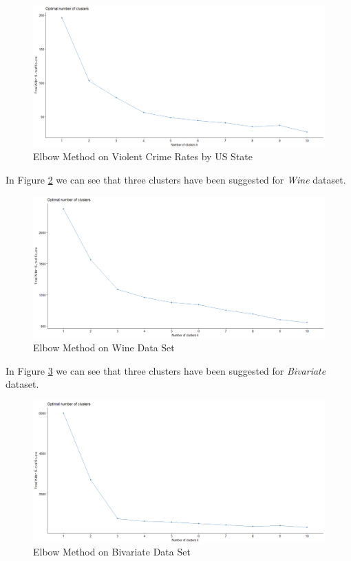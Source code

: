\begin{itemize}
\begin{figure}[h!]
  \centering
  \includegraphics[scale=1.3]{figures/results/USArrests/elbow.png}
  \caption{Elbow Method on Violent Crime Rates by US State}
  \label{fig:elbow5}
\end{figure}

\vspace{15mm}

In Figure \ref{fig:elbow6} we can see that three clusters have been suggested for \textit{Wine} dataset.

\begin{figure}[h!]
  \centering
  \includegraphics[scale=1.3]{figures/results/wine/elbow.png}
  \caption{Elbow Method on Wine Data Set}
  \label{fig:elbow6}
\end{figure}

\newpage

In Figure \ref{fig:elbow7} we can see that three clusters have been suggested for \textit{Bivariate} dataset.

\begin{figure}[h!]
  \centering
  \includegraphics[scale=1.3]{figures/results/xclara/elbow.png}
  \caption{Elbow Method on Bivariate Data Set}
  \label{fig:elbow7}
\end{figure}


\end{itemize}
